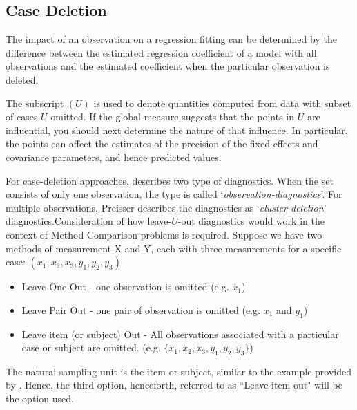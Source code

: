 \documentclass[12pt, a4paper]{report}
\theoremstyle{definition}
\theoremstyle{remark}
\begin{document}




\subsection*{Case Deletion}

The impact of an observation on a regression fitting can be determined by the difference between the estimated regression coefficient of a model with all observations and the estimated coefficient when the particular observation is deleted. 

The subscript $(U)$ is used to denote quantities computed from data with subset of cases $U$ omitted.
If the global measure suggests that the points in $U$ are influential, you should next determine the nature of
that influence. In particular, the points can affect the estimates of the precision of the fixed effects and covariance parameters, and hence predicted values.


For case-deletion approaches, \citet{preisser} describes two type of diagnostics. When the set consists of only one observation, the type is called
`\textit{observation-diagnostics}'. For multiple observations, Preisser describes the diagnostics as `\textit{cluster-deletion}' diagnostics.Consideration of how leave-$U$-out diagnostics would work in the context of Method Comparison problems is required.  Suppose we have two methods of measurement X and Y, each with three measurements for a specific case: $(x_1,x_2,x_3,y_1,y_2,y_3)$

\begin{itemize}
\item Leave One Out - one observation is omitted (e.g. $x_1$)
\item Leave Pair Out - one pair of observation  is omitted (e.g. $x_1$ and $y_1$)
\item Leave item (or subject) Out - All observations associated with a particular case or subject are omitted. (e.g. $\{x_1,x_2,x_3,y_1,y_2,y_3\}$)
\end{itemize}

The natural sampling unit is the item or subject, similar to the example provided by \citet{schabenberger}. Hence, the third option, henceforth, referred to as ``Leave item out" will be the option used.
\end{document}
